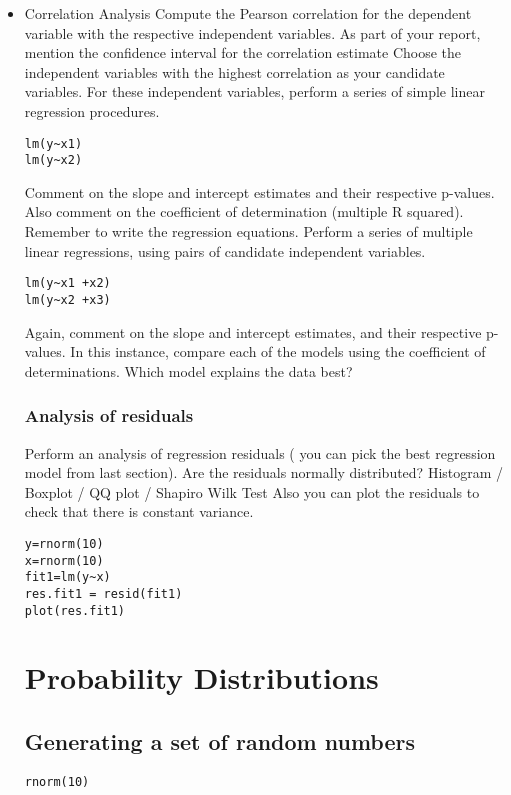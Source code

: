 \documentclass[a4paper,12pt]{article}
\begin{document}
\begin{itemize}
\begin{itemize}
\item{Correlation Analysis}
Compute the Pearson correlation for the dependent variable with the respective independent variables.  As part of your report, mention the confidence interval for the correlation estimate
Choose the independent variables with the highest correlation as your candidate variables.
For these independent variables, perform a series of simple linear regression procedures.
\begin{verbatim}
lm(y~x1)
lm(y~x2)
\end{verbatim}
Comment on the slope and intercept estimates and their respective p-values. Also comment on the coefficient of determination (multiple R squared). Remember to write the regression equations.
Perform a series of multiple linear regressions, using pairs of candidate independent variables.
\begin{verbatim}
lm(y~x1 +x2)
lm(y~x2 +x3)
\end{verbatim}
Again, comment on the slope and intercept estimates, and their respective p-values.
In this instance, compare each of the models using the coefficient of determinations. Which model explains the data best?
\subsection{Analysis of residuals}
Perform an analysis of regression residuals ( you can pick the best regression model from last section).
Are the residuals normally distributed?
	Histogram /  Boxplot / QQ plot / Shapiro Wilk Test
Also you can plot the residuals to check that there is constant variance.
\begin{verbatim}
y=rnorm(10)
x=rnorm(10)
fit1=lm(y~x)
res.fit1 = resid(fit1)
plot(res.fit1)
\end{verbatim}




\newpage
\chapter{Probability Distributions}
\section{Generating a set of random numbers}

\begin{myindentpar}{1cm}
\footnotesize \begin{verbatim}
rnorm(10)
\end{verbatim}\normalsize
\end{myindentpar}


\end{itemize}
\end{itemize}
\end{document}
